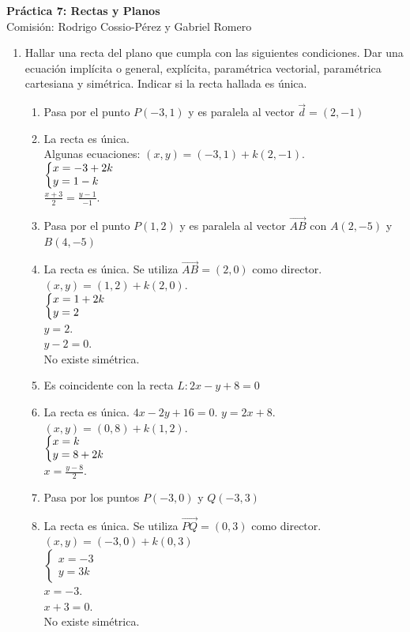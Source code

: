 \documentclass[a4paper]{article}
\newcommand{\answer}{\item[**]}
\newcommand{\exercise}{\item}
\newcommand{\SEL}[1]{\left\{\begin{matrix} #1 \end{matrix}\right.}
\begin{document}
\noindent \hrulefill 
\vspace{-7pt}
\begin{center} 
	\textbf{ Práctica 7: Rectas y Planos } \\
	Comisión: Rodrigo Cossio-Pérez y Gabriel Romero
\end{center}
\vspace{-10pt}
\hrulefill


\begin{enumerate}

	\exercise Hallar una recta del plano que cumpla con las siguientes condiciones. Dar una ecuación implícita o general, explícita, paramétrica vectorial, paramétrica cartesiana y simétrica. Indicar si la recta hallada es única.
	\begin{enumerate} [label=(\alph*)]
		
		\item Pasa por el punto $P(-3,1)$ y es paralela al vector $\vec{d}=(2,-1)$
		\answer La recta es única. \\ Algunas ecuaciones: $(x,y)=(-3,1)+k(2,-1)$. \\ $\SEL{ x=-3+2k \\ y=1-k \hfill }$ \\ $\displaystyle{\frac{x+3}{2}=\frac{y-1}{-1}}$.

		\item Pasa por el punto $P(1,2)$ y es paralela al vector $\overrightarrow{AB}$ con $A(2,-5)$ y $B(4,-5)$
		\answer La recta es única. Se utiliza $\overrightarrow{AB}=(2,0)$ como director. \\ $(x,y)=(1,2)+k(2,0)$. \\ $\SEL{ x=1+2k \\ y=2 \hfill }$ \\ $y=2$.\\ $y-2=0$. \\ No existe simétrica.

		\item Es coincidente con la recta $L: 2x-y+8=0$
		\answer La recta es única. $4x-2y+16=0$. $y=2x+8$. $(x,y)=(0,8)+k(1,2)$. \\ $\SEL{ x=k \hfill \\ y=8+2k }$ \\ $\displaystyle{x=\frac{y-8}{2}}$.

		\item Pasa por los puntos $P(-3,0)$ y $Q(-3,3)$
		\answer La recta es única. Se utiliza $\overrightarrow{PQ}=(0,3)$ como director. \\ $(x,y)=(-3,0)+k(0,3)$  \\ $\SEL{ x=-3 \\ y=3k }$ \\ $x=-3$. \\ $x+3=0$. \\ No existe simétrica.


\end{enumerate}
\end{enumerate}
\end{document}
